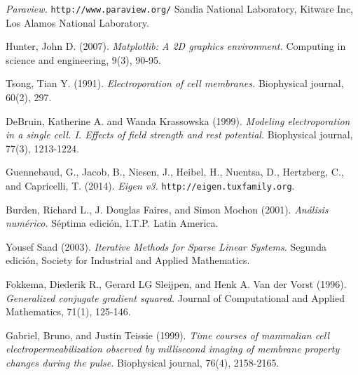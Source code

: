 \begin{thebibliography}{99}
	\emph{Paraview.}
	\texttt{http://www.paraview.org/}
	Sandia National Laboratory, Kitware Inc, Los Alamos National Laboratory.

	Hunter, John D. (2007). \emph{Matplotlib: A 2D graphics environment.} Computing in science and engineering, 9(3), 90-95.

	Tsong, Tian Y. (1991). \emph{Electroporation of cell membranes.} Biophysical journal, 60(2), 297.

	DeBruin, Katherine A. and Wanda Krassowska (1999). \emph{Modeling electroporation in a single cell. I. Effects of field strength and rest potential.} Biophysical journal, 77(3), 1213-1224.
	
	Guennebaud, G., Jacob, B., Niesen, J., Heibel, H., Nuentsa, D., Hertzberg, C., and Capricelli, T. (2014). \emph{Eigen v3.} \texttt{http://eigen.tuxfamily.org}.
	
	Burden, Richard L., J. Douglas Faires, and Simon Mochon (2001). \emph{Análisis numérico.} Séptima edición, I.T.P. Latin America.

	Yousef Saad (2003). \emph{Iterative Methods for Sparse Linear Systems.}	Segunda edición, Society for Industrial and Applied Mathematics.

	Fokkema, Diederik R., Gerard LG Sleijpen, and Henk A. Van der Vorst (1996). \emph{Generalized conjugate gradient squared.} Journal of Computational and Applied Mathematics, 71(1), 125-146.

	Gabriel, Bruno, and Justin Teissie (1999). \emph{Time courses of mammalian cell electropermeabilization observed by millisecond imaging of membrane property changes during the pulse.} Biophysical journal, 76(4), 2158-2165.


\end{thebibliography}
